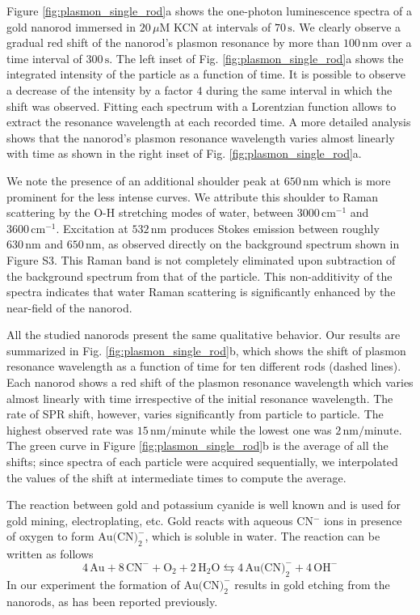 \documentclass[twoside,twocolumn,11pt]{article}
\newcommand{\nm}{\ensuremath{\,\textrm{nm}}}
\newcommand{\uM}{\ensuremath{\,\mu\textrm{M}}}
\begin{document}
Figure \ref{fig:plasmon_single_rod}a shows the one-photon luminescence spectra
of a gold nanorod immersed in $20\uM$ KCN at intervals of $70\,\text{s}$. We
clearly observe a gradual red shift of the nanorod's plasmon resonance by more
than $100\nm$ over a time interval of $300\,\text{s}$. The left inset of 
Fig. \ref{fig:plasmon_single_rod}a shows the integrated intensity of the
particle as a function of time. It is possible to observe a decrease of the intensity by a factor $4$ during the same
interval in which the shift was observed. Fitting each spectrum with a
Lorentzian function allows to extract the resonance wavelength at each recorded
time. A more detailed analysis shows that the nanorod's plasmon resonance
wavelength varies almost linearly with time as shown in the
right inset of Fig. \ref{fig:plasmon_single_rod}a.

We note the presence of an additional shoulder peak at $650\nm$ which is more
prominent for the less intense curves. We attribute this shoulder to Raman
scattering by the O-H stretching modes of water, between $3000\,\text{cm}^{-1}$
and $3600\,\text{cm}^{-1}$. Excitation at $532\nm$ produces Stokes emission
between roughly $630\nm$ and $650\nm$, as observed directly on the background
spectrum shown in Figure S3. This Raman band is not completely eliminated upon
subtraction of the background spectrum from that of the particle. This
non-additivity of the spectra indicates that water Raman scattering is
significantly enhanced by the near-field of the nanorod\cite{Snow1985}.

All the studied nanorods present the same qualitative behavior. Our results are
summarized in Fig. \ref{fig:plasmon_single_rod}b, which shows the shift of
plasmon resonance wavelength as a function of time for ten different rods (dashed
lines). Each nanorod shows a red shift of the plasmon resonance wavelength which
varies almost linearly with time irrespective of the initial resonance
wavelength. The rate of SPR shift, however, varies significantly from particle
to particle. The highest observed rate was $15\nm/\textrm{minute}$ while the
lowest one was $2\nm/\textrm{minute}$. The green curve in Figure
\ref{fig:plasmon_single_rod}b is the average of all the shifts; since spectra of
each particle were acquired sequentially, we interpolated the values of the
shift at intermediate times to compute the average.

The reaction between gold and potassium cyanide is well known and is used
for gold mining, electroplating, etc. Gold reacts with aqueous CN$^-$ ions in
presence of oxygen to form $\textrm{Au(CN)}_2^-$, which is soluble in water. The
reaction can be written as follows
\begin{equation*}
4\,\textrm{Au} + 8\,\textrm{CN}^-+\textrm{O}_2 + 2\,\textrm{H}_2\textrm{O}
\leftrightarrows 4\,\textrm{Au(CN)}_2^-+4\,\textrm{OH}^- \end{equation*}
In our experiment the formation of $\textrm{Au(CN)}_2^-$ results in gold etching
from the nanorods, as has been reported previously\cite{Jana2002}.
\end{document}
